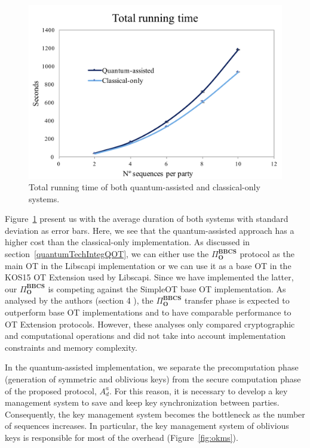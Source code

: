 \begin{figure}
    \centering
    \includegraphics[scale=0.8]{Chapter_PrivatePhylogeneticTrees/total_running.png}
    \caption{Total running time of both quantum-assisted and classical-only systems.}
    \label{fig:total_running_time}
\end{figure}

Figure~\ref{fig:total_running_time} present us with the average duration of both systems with standard deviation as error bars. Here, we see that the quantum-assisted approach has a higher cost than the classical-only implementation. As discussed in section~\ref{quantumTechIntegQOT}, we can either use the $\Pi^{\textbf{BBCS}}_{\textbf{O}}$ protocol as the main OT in the Libscapi implementation or we can use it as a base OT in the KOS15 OT Extension used by Libscapi. Since we have implemented the latter, our $\Pi^{\textbf{BBCS}}_{\textbf{O}}$ is competing against the SimpleOT \cite{C15} base OT implementation. As analysed by the authors (section 4 \cite{SPM21}), the $\Pi^{\textbf{BBCS}}_{\textbf{O}}$ transfer phase is expected to outperform base OT implementations and to have comparable performance to OT Extension protocols. However, these analyses only compared cryptographic and computational operations and did not take into account implementation constraints and memory complexity.

In the quantum-assisted implementation, we separate the precomputation phase (generation of symmetric and oblivious keys) from the secure computation phase of the proposed protocol, $A^a_d$. For this reason, it is necessary to develop a key management system to save and keep key synchronization between parties. Consequently, the key management system becomes the bottleneck as the number of sequences increases. In particular, the key management system of oblivious keys is responsible for most of the overhead (Figure~\ref{fig:okms}).

